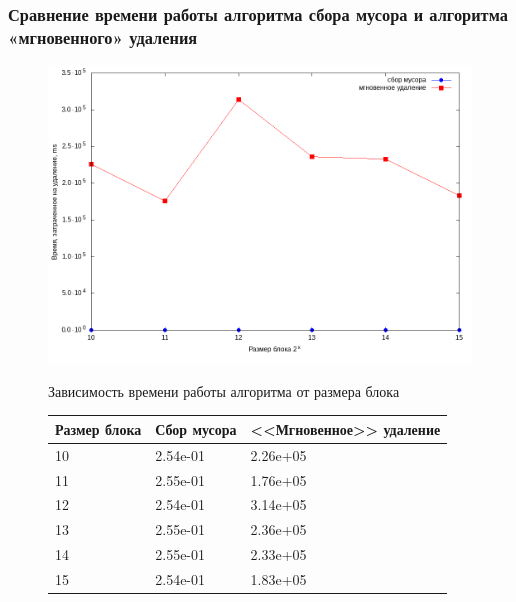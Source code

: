 \documentclass[aspectratio=169, pdf, 8pt, unicode]{beamer}
\begin{document}
\begin{frame}[fragile]
\frametitle{Сравнение времени работы алгоритма сбора мусора и алгоритма
«мгновенного» удаления}
\begin{figure}[H]
\centering
\begin{minipage}[h]{0.475\linewidth}
\includegraphics[width=1\textwidth]{fig/time_1e5.png}
\caption{Зависимость времени работы алгоритма от размера блока}
\end{minipage}
\hfil
\begin{minipage}[h]{0.35\linewidth}
\caption{Время работы алгоритмов для
    $10^5$ документов, мс}
\begin{table}[H]
      \centering
      \small
      \singlespacing
      \begin{tabular}{|p{1.5cm}|p{1.5cm}|p{2cm}|}
            \hline
            Размер блока & Сбор мусора                & <<Мгновенное>> удаление \\ \hline \hline
            10           & 2.54e-01                   & 2.26e+05              \\ \hline
            11           & 2.55e-01                   & 1.76e+05              \\ \hline
            12           & 2.54e-01                   & 3.14e+05              \\ \hline
            13           & 2.55e-01                   & 2.36e+05              \\ \hline
            14           & 2.55e-01                   & 2.33e+05              \\ \hline
            15           & 2.54e-01                   & 1.83e+05              \\ \hline
\end{tabular}
\end{table}
\end{minipage}
\end{figure}
\end{frame}
\end{document}
